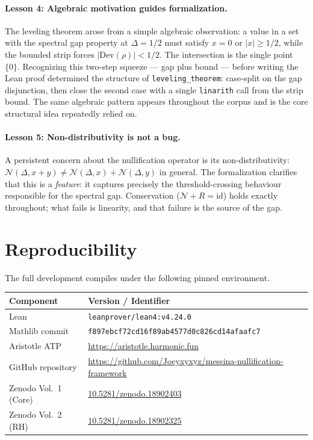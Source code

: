 \documentclass[12pt, a4paper]{article}
\theoremstyle{plain}
\theoremstyle{definition}
\newcommand{\N}{\mathcal{N}}
\newcommand{\lean}[1]{\texttt{#1}}
\begin{document}
\paragraph{Lesson 4: Algebraic motivation guides formalization.}
The leveling theorem arose from a simple algebraic observation: a value
in a set with the spectral gap property at $\Delta = 1/2$ must satisfy
$x = 0$ or $|x| \geq 1/2$, while the bounded strip forces
$|\mathrm{Dev}(\rho)| < 1/2$.
The intersection is the single point $\{0\}$.
Recognizing this two-step squeeze --- gap plus bound --- before writing
the Lean proof determined the structure of \lean{leveling\_theorem}:
case-split on the gap disjunction, then close the second case with a
single \lean{linarith} call from the strip bound.
The same algebraic pattern appears throughout the corpus and is the
core structural idea repeatedly relied on.

\paragraph{Lesson 5: Non-distributivity is not a bug.}
A persistent concern about the nullification operator is its
non-distributivity: $\N(\Delta, x + y) \neq \N(\Delta, x) + \N(\Delta, y)$
in general.
The formalization clarifies that this is a \emph{feature}: it captures
precisely the threshold-crossing behaviour responsible for the spectral gap.
Conservation ($\N + R = \mathrm{id}$) holds exactly throughout; what fails
is linearity, and that failure is the source of the gap.

\section*{Reproducibility}
\label{sec:reproducibility}

The full development compiles under the following pinned environment.

\begin{center}
\renewcommand{\arraystretch}{1.25}
\begin{tabular}{ll}
  \toprule
  \textbf{Component}   & \textbf{Version / Identifier} \\
  \midrule
  Lean                 & \texttt{leanprover/lean4:v4.24.0} \\
  Mathlib commit       & \texttt{f897ebcf72cd16f89ab4577d0c826cd14afaafc7} \\
  Aristotle ATP        & \url{https://aristotle.harmonic.fun} \\
  GitHub repository    & \url{https://github.com/Joeyxyxyz/messina-nullification-framework} \\
  Zenodo Vol.~1 (Core) & \href{https://doi.org/10.5281/zenodo.18902403}{10.5281/zenodo.18902403} \\
  Zenodo Vol.~2 (RH)   & \href{https://doi.org/10.5281/zenodo.18902325}{10.5281/zenodo.18902325} \\
  \bottomrule
\end{tabular}
\end{center}
\end{document}
